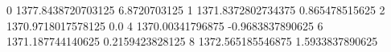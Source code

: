 0 1377.8438720703125 6.8720703125
1 1371.8372802734375 0.865478515625
2 1370.9718017578125 0.0
4 1370.00341796875 -0.9683837890625
6 1371.187744140625 0.2159423828125
8 1372.565185546875 1.5933837890625
